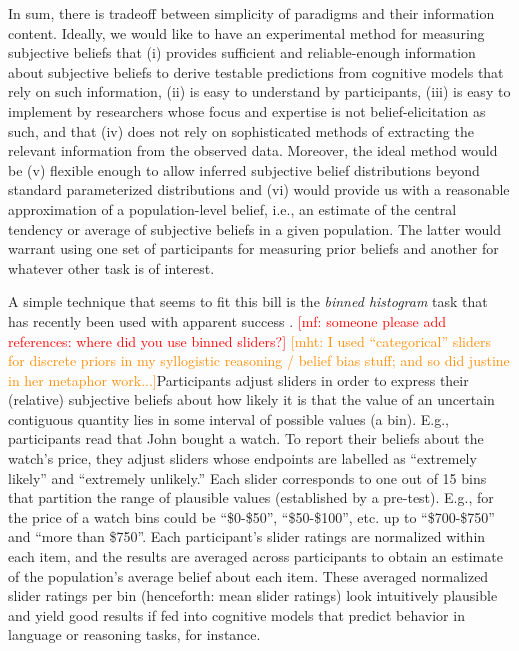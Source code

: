 \documentclass[10pt,letterpaper]{article}
\newcommand{\mf}[1]{\textcolor{Red}{[mf: #1]}}
\newcommand{\mht}[1]{\textcolor{DarkOrange}{[mht: #1]}}
\newcommand{\citep}[1]{\cite{#1}}
\begin{document}
In sum, there is tradeoff between simplicity of paradigms and their information content. Ideally, we
would like to have an experimental method for measuring subjective beliefs that (i) provides
sufficient and reliable-enough information about subjective beliefs to derive testable
predictions from cognitive models that rely on such information, (ii) is easy to understand by
 participants, (iii) is easy to implement by researchers whose focus and expertise is not
belief-elicitation as such, and that (iv) does not rely on sophisticated methods of extracting
the relevant information from the observed data. Moreover, the ideal method would be (v)
flexible enough to allow inferred subjective belief distributions beyond standard parameterized
distributions and (vi) would provide us with a reasonable approximation of a population-level
belief, i.e., an estimate of the central tendency or average of subjective beliefs in a given
population. The latter would warrant using one set of participants for measuring prior beliefs and
another for whatever other task is of interest.



A simple technique that seems to fit this bill is the \emph{binned histogram} task that has
recently been used with apparent success
\citep{KaoWu2014:Nonliteral-Unde,SchollerFranke2015:Semantic-values}. \mf{someone please add
  references: where did you use binned sliders?} \mht{I used ``categorical'' sliders for discrete priors in my syllogistic reasoning / belief bias stuff; and so did justine in her metaphor work...}Participants adjust sliders in order to
express their (relative) subjective beliefs about how likely it is that the value of an
uncertain contiguous quantity lies in some interval of possible values (a bin). E.g.,
participants read that John bought a watch.  To report their beliefs about the watch's price,
they adjust sliders whose endpoints are labelled as ``extremely likely'' and ``extremely
unlikely.'' Each slider corresponds to one out of 15 bins that partition the range of plausible
values (established by a pre-test). E.g., for the price of a watch bins could be ``\$0-\$50'',
``\$50-\$100'', etc. up to ``\$700-\$750'' and ``more than \$750''. Each participant's slider
ratings are normalized within each item, and the results are averaged across participants to obtain
an estimate of the population's average belief about each item. These averaged normalized
slider ratings per bin (henceforth: mean slider ratings) look intuitively plausible and yield
good results if fed into cognitive models that predict behavior in language or reasoning tasks,
for instance.
\end{document}
